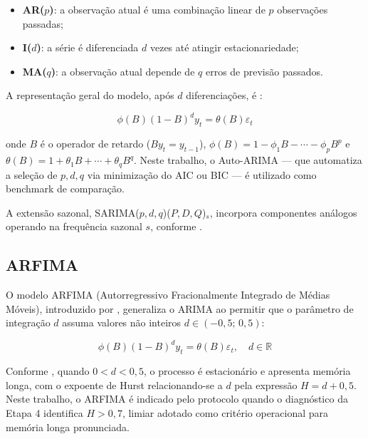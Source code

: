 \documentclass[
  12pt,
  openright,
  twoside,
  a4paper,
  english,
  brazil
]{abntex2}
\begin{document}
\begin{itemize}
  \item \textbf{AR($p$)}: a observação atual é uma combinação linear de $p$ observações passadas;
  \item \textbf{I($d$)}: a série é diferenciada $d$ vezes até atingir estacionariedade;
  \item \textbf{MA($q$)}: a observação atual depende de $q$ erros de previsão passados.
\end{itemize}

A representação geral do modelo, após $d$ diferenciações, é \cite{box1970time}:

\begin{equation}
  \phi(B)(1 - B)^d y_t = \theta(B)\varepsilon_t
  \label{eq:arima}
\end{equation}

onde $B$ é o operador de retardo ($By_t = y_{t-1}$), $\phi(B) = 1 - \phi_1 B - \cdots - \phi_p B^p$ e $\theta(B) = 1 + \theta_1 B + \cdots + \theta_q B^q$. Neste trabalho, o Auto-ARIMA — que automatiza a seleção de $p, d, q$ via minimização do AIC ou BIC — é utilizado como benchmark de comparação.

A extensão sazonal, SARIMA($p, d, q$)($P, D, Q$)$_s$, incorpora componentes análogos operando na frequência sazonal $s$, conforme .

\subsection{ARFIMA}
\label{subsec:arfima}

O modelo ARFIMA (Autorregressivo Fracionalmente Integrado de Médias Móveis), introduzido por , generaliza o ARIMA ao permitir que o parâmetro de integração $d$ assuma valores não inteiros $d \in (-0{,}5;\, 0{,}5)$:

\begin{equation}
  \phi(B)(1 - B)^d y_t = \theta(B)\varepsilon_t, \quad d \in \mathbb{R}
  \label{eq:arfima}
\end{equation}

Conforme , quando $0 < d < 0{,}5$, o processo é estacionário e apresenta memória longa, com o expoente de Hurst relacionando-se a $d$ pela expressão $H = d + 0{,}5$. Neste trabalho, o ARFIMA é indicado pelo protocolo quando o diagnóstico da Etapa 4 identifica $H > 0{,}7$, limiar adotado como critério operacional para memória longa pronunciada.
\end{document}
